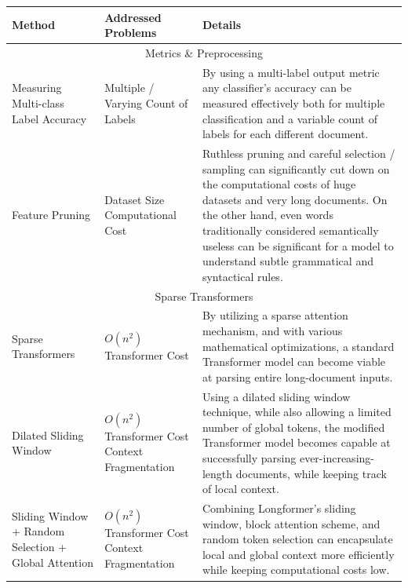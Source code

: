 \documentclass[preprint,review,12pt]{elsarticle}
\begin{document}
    \begin{table}[H]
        \scriptsize
        \begin{tabular}
             { |p{3cm}|p{3cm}|p{9cm}|  }
             \hline
             \textbf{Method} & \textbf{Addressed Problems} & \textbf{Details}\\
            \hline
             \multicolumn{3}{|c|}{Metrics \& Preprocessing} \\
             \hline
             Measuring Multi-class Label Accuracy \cite{sicong}  & Multiple / Varying Count of Labels & By using a multi-label output metric any classifier's accuracy can be measured effectively both for multiple classification and a variable count of labels for each different document.\\
             \hline
             Feature Pruning \cite{sicong, worsham}& Dataset Size \break \break Computational Cost & Ruthless pruning and careful selection / sampling can significantly cut down on the computational costs of huge datasets and very long documents. On the other hand, even words traditionally considered semantically useless can be significant for a model to understand subtle grammatical and syntactical rules.\\
             \hline

             \multicolumn{3}{|c|}{Sparse Transformers} \\
             \hline
             
              Sparse Transformers \cite{sparse_attention} & $O(n^2)$ Transformer Cost & By utilizing a sparse attention mechanism, and with various mathematical optimizations, a standard Transformer model can become viable at parsing entire long-document inputs.\\
            \hline
             Dilated Sliding Window \cite{longformer} & $O(n^2)$ Transformer Cost \break\break Context Fragmentation & Using a dilated sliding window technique, while also allowing a limited number of global tokens, the modified Transformer model becomes capable at successfully parsing ever-increasing-length documents, while keeping track of local context.\\
             \hline
             Sliding Window + Random Selection + Global Attention\cite{big_bird} & $O(n^2)$ Transformer Cost \break\break Context Fragmentation & Combining Longformer's sliding window, block attention scheme, and random token selection can encapsulate local and global context more efficiently while keeping computational costs low. \\
             \hline


\end{tabular}
\end{table}
\end{document}
